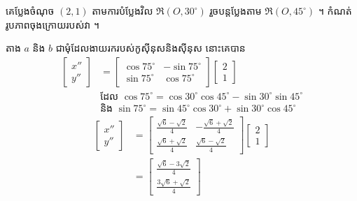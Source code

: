 \begin{example}[លំហាត់គំរូ ១]
គេប្លែងចំណុច $(2, 1)$ តាមការបំប្លែងវិល $\mathfrak{R}(O, 30^\circ)$ រួចបន្តប្លែងតាម $\mathfrak{R}(O, 45^\circ)$ ។ កំណត់រូបភាពចុងក្រោយរបស់វា ។
\end{example}
\ans
តាង $a$ និង $b$ ជាមុំដែលងាយរករបស់កូស៊ីនុសនិងស៊ីនុស នោះគេបាន
\[
\begin{aligned}
\begin{bmatrix} x''\\ y'' \end{bmatrix} &= \begin{bmatrix} \cos 75^\circ & -\sin 75^\circ\\ \sin 75^\circ & \cos 75^\circ \end{bmatrix}\begin{bmatrix} 2\\ 1 \end{bmatrix}\\
&\text{ដែល } \cos 75^\circ = \cos 30^\circ\cos 45^\circ - \sin 30^\circ\sin 45^\circ\\
&\text{និង } \sin 75^\circ = \sin 45^\circ\cos 30^\circ + \sin 30^\circ\cos 45^\circ
\end{aligned}
\]
\[
\begin{aligned}
\begin{bmatrix} x''\\ y'' \end{bmatrix} &= \begin{bmatrix} \frac{\sqrt{6} - \sqrt{2}}{4} & -\frac{\sqrt{6} + \sqrt{2}}{4}\\[3pt] \frac{\sqrt{6} + \sqrt{2}}{4} & \frac{\sqrt{6} - \sqrt{2}}{4} \end{bmatrix}\begin{bmatrix} 2\\ 1 \end{bmatrix}\\
&= \begin{bmatrix} \frac{\sqrt{6} - 3\sqrt{2}}{4}\\[3pt] \frac{3\sqrt{6} + \sqrt{2}}{4} \end{bmatrix}
\end{aligned}
\]

